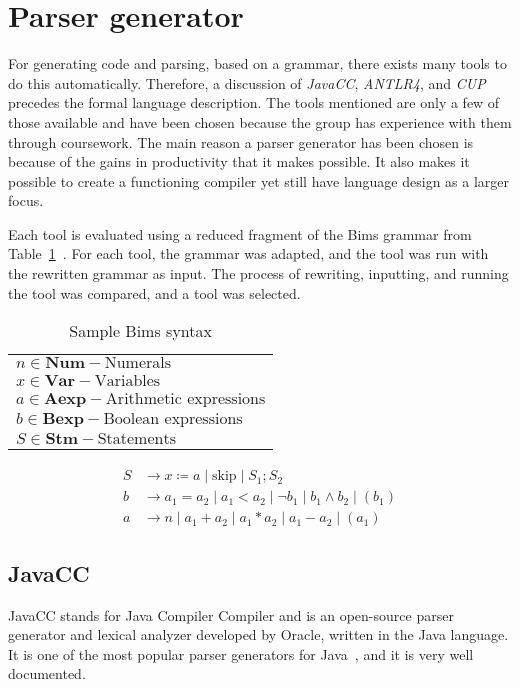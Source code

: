 \section{Parser generator}\label{sec:parsergenerator}
For generating code and parsing, based on a grammar, there exists many tools to do this automatically. Therefore, a discussion of \textit{JavaCC}, \textit{ANTLR4}, and \textit{CUP} precedes the formal language description. The tools mentioned are only a few of those available and have been chosen because the group has experience with them through coursework.  The main reason a parser generator has been chosen is because of the gains in productivity that it makes possible. It also makes it possible to create a functioning compiler yet still have language design as a larger focus.

Each tool is evaluated using a reduced fragment of the Bims grammar from Table~\ref{tab:bimsgrammar}~\cite{Huttel2010}. For each tool, the grammar was adapted, and the tool was run with the rewritten grammar as input. The process of rewriting, inputting, and running the tool was compared, and a tool was selected.


\begin{table}[htb!]
  \centering
  \begin{tabular}{l}
    $n \in \textbf{Num} - \text{Numerals}$                \\
    $x \in \textbf{Var} - \text{Variables}$               \\
    $a \in \textbf{Aexp} - \text{Arithmetic expressions}$ \\
    $b \in \textbf{Bexp} - \text{Boolean expressions}$    \\
    $S \in \textbf{Stm} - \text{Statements}$              \\
  \end{tabular}
  \begin{align*}
    S & \rightarrow x \coloneqq a \mid \text{skip} \mid S_1;S_2                          \\
    b & \rightarrow a_1 = a_2 \mid a_1 < a_2 \mid \neg b_1 \mid b_1 \land b_2 \mid (b_1) \\
    a & \rightarrow n \mid a_1 + a_2 \mid a_1 * a_2 \mid a_1 - a_2 \mid (a_1)
  \end{align*}
  \caption{Sample Bims syntax \cite{Huttel2010}}
  \label{tab:bimsgrammar}
\end{table}


\subsection{JavaCC}
JavaCC stands for Java Compiler Compiler and is an open-source parser generator and lexical analyzer developed by Oracle, written in the Java language. It is one of the most popular parser generators for Java~\cite{JavaCC2021}, and it is very well documented.

